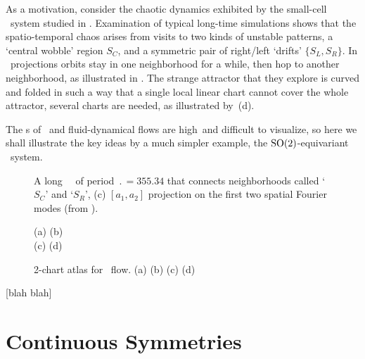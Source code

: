\documentclass[aip,cha,
reprint,
secnumarabic,
nofootinbib, tightenlines,
nobibnotes, showkeys, showpacs,
groupedaddress,
]{revtex4-1}
\begin{document}
As a motivation, consider the chaotic dynamics exhibited by the
small-cell \KS\ system studied in . Examination of
typical long-time simulations shows that the spatio-temporal chaos arises
from visits to two kinds of unstable patterns, a `central wobble' region
$S_C$, and a symmetric pair of right/left `drifts' $\{S_L,S_R\}$. In
\statesp\ projections orbits stay in one neighborhood for a while, then
hop to another neighborhood, as illustrated in . The
strange attractor that they explore is curved and folded in such a way
that a single local linear chart cannot cover the whole attractor,
several charts are needed, as illustrated by \,(d).

The \statesp s of \KS\ and fluid-dynamical flows are high\dmn\ and
difficult to visualize, so here we shall illustrate the key ideas by a
much simpler example, the $\textrm{SO}(2)$-equivariant  \twoMode\ system.

\begin{figure} %
    \centering
\caption[]{
A long \KS\ \po\ of period $\period{}=355.34$ that connects
neighborhoods called `$S_C$' and `$S_R$',
(c) $[a_1,a_2]$  projection on the first two spatial Fourier modes
(from ).
      }
\label{f:antlong}
\end{figure}

\begin{figure}
 \begin{center}
 \setlength{\unitlength}{0.20\textwidth}
(a)
(b)
\\
(c)
(d)
 \end{center}
    \caption{
2-chart atlas for \twoMode\ flow.
(a)
(b)
(c)
(d)
    }
\label{fig:2modeSects}
\end{figure}

 [blah blah]

\section{Continuous Symmetries}
\label{s:symm}
\end{document}
